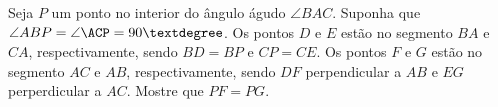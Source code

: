 Seja $P$ um ponto no interior do ângulo águdo $\angle BAC$. Suponha que $\angle ABP = \angle \ACP = 90°$. Os pontos $D$ e $E$ estão no segmento $BA$ e $CA$, respectivamente, sendo $BD = BP$ e $CP = CE$. Os pontos $F$ e $G$ estão no segmento $AC$ e $AB$, respectivamente, sendo $DF$ perpendicular a $AB$ e $EG$ perperdicular a $AC$. Mostre que $PF = PG$.